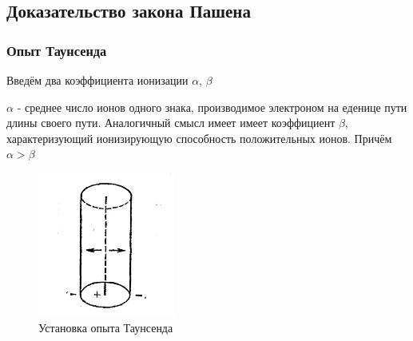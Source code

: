 \documentclass[a4paper, 12pt]{article}
\begin{document}
\newpage
\subsection{Доказательство закона Пашена}


\subsubsection{Опыт Таунсенда}

Введём два коэффициента ионизации $\alpha$, $\beta$
\newline \par
$\alpha$ - среднее число ионов одного знака, производимое электроном на еденице пути длины
своего пути. Аналогичный смысл имеет имеет коэффициент $\beta $, характеризующий ионизирующую
способность положительных ионов. Причём  $\alpha > \beta$\newline
\begin{figure}
	\vspace{-10pt}
	\centering
	\includegraphics[width=0.4\textwidth]{ pics/setup.png}
	\caption{Установка опыта Таунсенда}
\end{figure}
\end{document}
